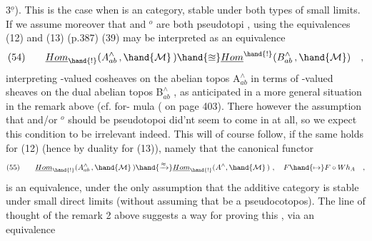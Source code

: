 \hand{\uline{\textcolor{black}{Case}}} 3$^{\underline{o}}$). This is the case when  is an \hand{\uline{\textcolor{black}{additive}}} category,
stable under both types of small limits. If we assume moreover that
  and $^{o}$ are both pseudotopi , using the equivalences (12)
and (13) (p.387)\hand{,} (39) may be interpreted as an equivalence
\[ (54) \qquad \underline{Hom}_{\hand{!}}(A^{\wedge}_{ab}\, ,\hand{\mathcal{M}}\,) \hand{\approxeq} \underline{Hom}^{\hand{!}}(B^{\wedge}_{ab}\, ,\hand{\mathcal{M}}) \quad , \]
interpreting  -valued cosheaves on the abelian topos A$^\wedge_{ab}$
in terms of  -valued sheaves on the dual abelian topos B$^\wedge_{ab}$ ,
as anticipated in a more general situation in the remark above (cf. for-%
mula (\over{**}{**}\hand{*}\over{)}{)} on page 403). There however the assumption that  and/or $^{o}$
should be pseudotopoi did'nt seem to come in at all, so we expect this
condition to be irrelevant indeed. This will of course follow, if the
same holds for (12) (hence by duality for (13)), namely that the
canonical functor
\[ (55) \qquad \underline{Hom}_{\hand{!}}(A^{\wedge}_{ab}\, ,\hand{\mathcal{M}}\,) \hand{\xrightarrow{\approx}} \underline{Hom}_{\hand{!}}(A^{\wedge},\hand{\mathcal{M}}\,) \ , \quad F\hand{\mapsto} F\circ Wh_{A} \quad , \]
is an equivalence, under the only assumption that the additive category
 is stable under small direct limits (without assuming that  be a
pseudocotopos). The line of thought of the remark 2 above suggests
a way for proving this , via an equivalence

